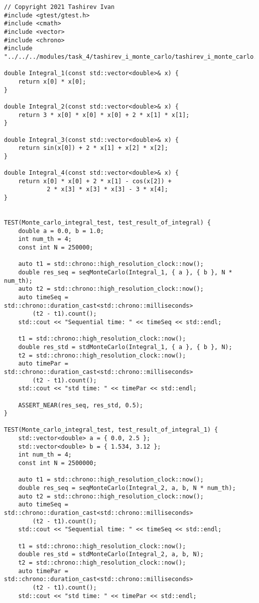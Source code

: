 \documentclass{report}
\begin{document}
\begin{lstlisting}
// Copyright 2021 Tashirev Ivan
#include <gtest/gtest.h>
#include <cmath>
#include <vector>
#include <chrono>
#include "../../../modules/task_4/tashirev_i_monte_carlo/tashirev_i_monte_carlo.h"

double Integral_1(const std::vector<double>& x) {
    return x[0] * x[0];
}

double Integral_2(const std::vector<double>& x) {
    return 3 * x[0] * x[0] * x[0] + 2 * x[1] * x[1];
}

double Integral_3(const std::vector<double>& x) {
    return sin(x[0]) + 2 * x[1] + x[2] * x[2];
}

double Integral_4(const std::vector<double>& x) {
    return x[0] * x[0] + 2 * x[1] - cos(x[2]) +
            2 * x[3] * x[3] * x[3] - 3 * x[4];
}


TEST(Monte_carlo_integral_test, test_result_of_integral) {
    double a = 0.0, b = 1.0;
    int num_th = 4;
    const int N = 250000;

    auto t1 = std::chrono::high_resolution_clock::now();
    double res_seq = seqMonteCarlo(Integral_1, { a }, { b }, N * num_th);
    auto t2 = std::chrono::high_resolution_clock::now();
    auto timeSeq = std::chrono::duration_cast<std::chrono::milliseconds>
        (t2 - t1).count();
    std::cout << "Sequential time: " << timeSeq << std::endl;

    t1 = std::chrono::high_resolution_clock::now();
    double res_std = stdMonteCarlo(Integral_1, { a }, { b }, N);
    t2 = std::chrono::high_resolution_clock::now();
    auto timePar = std::chrono::duration_cast<std::chrono::milliseconds>
        (t2 - t1).count();
    std::cout << "std time: " << timePar << std::endl;

    ASSERT_NEAR(res_seq, res_std, 0.5);
}

TEST(Monte_carlo_integral_test, test_result_of_integral_1) {
    std::vector<double> a = { 0.0, 2.5 };
    std::vector<double> b = { 1.534, 3.12 };
    int num_th = 4;
    const int N = 2500000;

    auto t1 = std::chrono::high_resolution_clock::now();
    double res_seq = seqMonteCarlo(Integral_2, a, b, N * num_th);
    auto t2 = std::chrono::high_resolution_clock::now();
    auto timeSeq = std::chrono::duration_cast<std::chrono::milliseconds>
        (t2 - t1).count();
    std::cout << "Sequential time: " << timeSeq << std::endl;

    t1 = std::chrono::high_resolution_clock::now();
    double res_std = stdMonteCarlo(Integral_2, a, b, N);
    t2 = std::chrono::high_resolution_clock::now();
    auto timePar = std::chrono::duration_cast<std::chrono::milliseconds>
        (t2 - t1).count();
    std::cout << "std time: " << timePar << std::endl;


\end{lstlisting}
\end{document}
